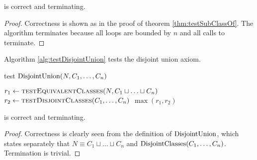 \documentclass[paper.tex]{subfiles}
\begin{document}
\begin{theorem}
   is correct and terminating.
\end{theorem}
\begin{proof}
  Correctness is shown as in the proof of theorem \ref{thm:testSubClassOf}.  The algorithm terminates because all loops are bounded by $n$ and all calls to  terminate.
\end{proof}

Algorithm \ref{alg:testDisjointUnion} tests the disjoint union axiom.

\begin{algorithm}[H]
  \caption{test $\mathrm{DisjointUnion}(N, C_1, \ldots, C_n)$}
  \label{alg:testDisjointUnion}
  \begin{algorithmic}[1]
    \raggedright
      \State $r_1 \gets \Call{testEquivalentClasses}{N, C_1 \sqcup \ldots \sqcup C_n}$
      \State $r_2 \gets \Call{testDisjointClasses}{C_1, \ldots, C_n}$
      \State \Return $\max(r_1, r_2)$
    \EndFunction
  \end{algorithmic}
\end{algorithm}

\begin{theorem}
   is correct and terminating.
\end{theorem}
\begin{proof}
  Correctness is clearly seen from the definition of $\mathrm{DisjointUnion}$, which states separately that $N \equiv C_1 \sqcup \ldots \sqcup C_n$ and $\mathrm{DisjointClasses}(C_1, \ldots, C_n)$.  Termination is trivial.
\end{proof}
\end{document}
